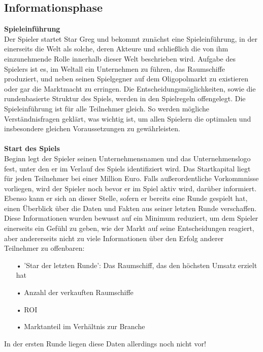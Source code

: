 \subsection{Informationsphase}
\label{sub:spielwelt-regeln-informationsphase}



\textbf{Spieleinführung}
\\
Der Spieler startet Star Greg und bekommt zunächst eine Spieleinführung, in der einerseits die Welt als solche, deren Akteure und schließlich die von ihm einzunehmende Rolle innerhalb dieser Welt beschrieben wird. Aufgabe des Spielers ist es, im Weltall ein Unternehmen zu führen, das Raumschiffe produziert, und neben seinen Spielgegner auf dem Oligopolmarkt zu existieren oder gar die Marktmacht zu erringen. Die Entscheidungsmöglichkeiten, sowie die rundenbasierte Struktur des Spiels, werden in den Spielregeln offengelegt. Die Spieleinführung ist für alle Teilnehmer gleich. So werden mögliche Verständnisfragen geklärt, was wichtig ist, um allen Spielern die optimalen und insbesondere gleichen Voraussetzungen zu gewährleisten. 
\\
\\

\textbf{Start des Spiels}
\\
Beginn legt der Spieler seinen Unternehmensnamen und das Unternehmenslogo fest, unter den er im Verlauf des Spiels identifiziert wird. Das Startkapital liegt für jeden Teilnehmer bei einer Million Euro. Falls außerordentliche Vorkommnisse vorliegen, wird der Spieler noch bevor er im Spiel aktiv wird, darüber informiert. Ebenso kann er sich an dieser Stelle, sofern er bereits eine Runde gespielt hat, einen Überblick über die Daten und Fakten aus seiner letzten Runde verschaffen. Diese Informationen wurden bewusst auf ein Minimum reduziert, um dem Spieler einerseits ein Gefühl zu geben, wie der Markt auf seine Entscheidungen reagiert, aber andererseits nicht zu viele Informationen über den Erfolg anderer Teilnehmer zu offenbaren:

\begin{itemize}
\item[•] 'Star der letzten Runde': Das Raumschiff, das den höchsten Umsatz erzielt hat
\item[•] Anzahl der verkauften Raumschiffe
\item[•] ROI
\item[•] Marktanteil im Verhältnis zur Branche
\end{itemize}

In der ersten Runde liegen diese Daten allerdings noch nicht vor! 
